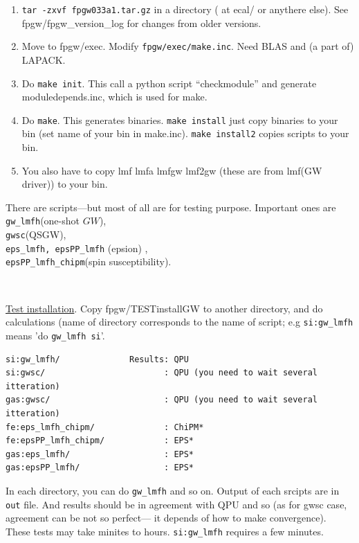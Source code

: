 \documentclass[a4paper,10pt,epsf,fleqn]{article}
\newcommand{\GW}{$GW$}
\begin{document}
\begin{enumerate}
\item
\verb#tar -zxvf fpgw033a1.tar.gz# in a directory ( at ecal/ or anythere else).
See fpgw/fpgw\_version\_log for changes from older versions.

\item
Move to fpgw/exec.  Modify \verb#fpgw/exec/make.inc#. Need BLAS and (a part of) LAPACK.

\item
Do \verb#make init#. This call a python script ``checkmodule'' and generate 
    moduledepends.inc, which is used for make.

\item
Do \verb#make#. This generates binaries. \verb#make install# just copy binaries to your bin
(set name of your bin in make.inc). \verb#make install2# copies scripts to your bin.

\item You also have to copy lmf lmfa lmfgw lmf2gw (these are from lmf(GW driver)) to your bin.

\end{enumerate}  

There are scripts---but most of all are for testing purpose. Important ones are\\
\verb#gw_lmfh#(one-shot \GW),\\
\verb#gwsc#(QSGW), \\
\verb#eps_lmfh, epsPP_lmfh# (epsion) ,\\
 \verb#epsPP_lmfh_chipm#(spin susceptibility).

 \

\noindent \underline{Test installation}. Copy fpgw/TESTinstallGW to another directory, and
do calculations (name of directory corresponds to the name of script;
e.g \verb#si:gw_lmfh# means 'do \verb#gw_lmfh si#'.
\begin{verbatim}
si:gw_lmfh/              Results: QPU 
si:gwsc/                        : QPU (you need to wait several itteration)
gas:gwsc/                       : QPU (you need to wait several itteration)
fe:eps_lmfh_chipm/              : ChiPM* 
fe:epsPP_lmfh_chipm/            : EPS*
gas:eps_lmfh/                   : EPS*
gas:epsPP_lmfh/                 : EPS*
\end{verbatim}
In each directory, you can do \verb#gw_lmfh# and so on.
Output of each srcipts are in \verb#out# file.
And results should be in agreement with QPU and so (as for gwsc case, agreement can be
not so perfect--- it depends of how to make convergence).
These tests may take minites to hours. \verb#si:gw_lmfh# requires a few minutes.
\end{document}
